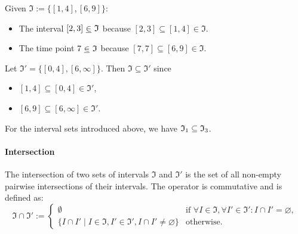     \begin{example} Given $\mathfrak{I}:= \{ [1, 4], [6, 9] \}$:
    \begin{itemize}
        \item The interval $[2, 3] ~\underline{\in}~ \mathfrak{I}$ because $[2, 3] \subseteq [1, 4] \in \mathfrak{I}$.
        \item The time point $7 ~\underline{\in}~ \mathfrak{I}$ because $[7, 7] \subseteq [6, 9] \in \mathfrak{I}$.
    \end{itemize}

    Let $\mathfrak{I'} = \{ [0, 4], [6, \infty] \}$. Then $\mathfrak{I} \subseteq \mathfrak{I'}$ since
    \begin{itemize}
        \item $[1, 4] \subseteq [0, 4] \in \mathfrak{I'}$,
        \item $[6, 9] \subseteq [6, \infty] \in \mathfrak{I'}$.
    \end{itemize}

    For the interval sets introduced above, we have $\mathfrak{I}_1 \subseteq \mathfrak{I}_3$.
    \end{example}

    \paragraph{Intersection} The intersection of two sets of intervals $\mathfrak{I}$ and $\mathfrak{I}'$ is the set of all non-empty pairwise intersections of their intervals. The operator is commutative and is defined as:
    $$
    \mathfrak{I} \cap \mathfrak{I}' :=\begin{cases}
     \emptyset& \text{if } \forall I\in \mathfrak{I}, \forall I'\in \mathfrak{I}': I \cap I'=\varnothing,\\
     \{ I \cap I' \mid I \in \mathfrak{I}, I' \in \mathfrak{I}', I \cap I' \neq \varnothing \} & \text{otherwise}.
    \end{cases}
    $$

